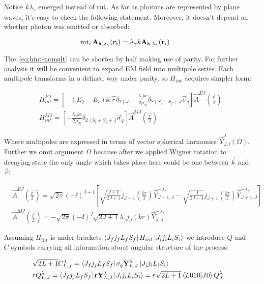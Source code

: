 Notice $k \lambda_\gamma$ emerged instead of $\operatorname{rot}$. As far as photons are represented by plane waves, it's easy to check the following statement. Moreover, it doesn't depend on whether photon was emitted or absorbed:

\begin{align}
    &\operatorname{rot}_i \mathbf{A_{\mathbf{k}, \lambda_\gamma}(\mathbf{r}_i)} = \lambda_\gamma k \mathbf{A}_{\mathbf{k}, \lambda_\gamma}(\mathbf{r}_i)
\end{align}

The~\cref{eq:hint-nomult} can be shorten by half making use of parity. For further analysis it will be convenient to expand EM field into multipole series. Each multipole transforms in a defined way under parity, so $H_{int}$ acquires simpler form:

\begin{align} \label{hint-mult-nobrak}
    &H_{int}^{EJ} = \left[ -(E_f - E_i) \ii e \vec{r} \delta_{2 \nmid J} - \frac{\lambda_\gamma k e}{2 \mu_R} \delta_{2 \mid S_i + S_f + J} \vec{\sigma}_q \right] \vec{A}^{EJ}(\frac{\vec{r}}{2}) \\
    &H_{int}^{MJ} = \left[ - \frac{\lambda_\gamma k e}{2 \mu_R} \delta_{2 \nmid S_i + S_f + J} \vec{\sigma}_q \right] \vec{A}^{MJ}(\frac{\vec{r}}{2}) 
\end{align}

Where multipoles are expressed in terms of vector spherical harmonics $\vec{Y}^\lambda_{J, l}(\Omega)$. Further we omit argument $\Omega$ because after we applied Wigner rotation to decaying state the only angle which takes place here could be one between $\vec{k}$ and $\vec{r}$:

\begin{align}
    &\vec{A}^{EJ}(\frac{\vec{r}}{2}) = \sqrt{2\pi} (-\ii)^{J+1} \left[ \sqrt{\frac{J+1}{2J+1}} j_{J-1}(\frac{kr}{2}) \vec{Y}^{-\lambda_\gamma}_{J-1, J} - \sqrt{\frac{J}{2J+1}} j_{J+1}(\frac{kr}{2}) \vec{Y}^{-\lambda_\gamma}_{J+1, J} \right] \\
    &\vec{A}^{MJ}(\frac{\vec{r}}{2}) = -\sqrt{2\pi} (-\ii)^J \sqrt{2J+1} \lambda_\gamma j_J(k r) \vec{Y}^{-\lambda_\gamma}_{J,J}
\end{align}

Assuming $H_{int}$ is under brackets $\bra{J_f j_f L_f S_f} H_{int} \ket{J_i j_i L_i S_i}$  we introduce $Q$ and $C$ symbols carrying all information about angular structure of the process:

\begin{align}
    &\sqrt{2L+1} C^\lambda_{L, J} = \bra{J_f j_j L_f S_f} \mathbf{\sigma}_q \mathbf{Y}^{\lambda}_{L, J} \ket{J_i j_i L_i S_i} \\
    &r Q^{\lambda}_{L, J} = \bra{J_f j_j L_f S_f} \mathbf{r} \mathbf{Y}^{\lambda}_{L, J} \ket{J_i j_i L_i S_i} = r \sqrt{2L+1} \braket{L010}{J0} Q^\lambda_J
\end{align}

